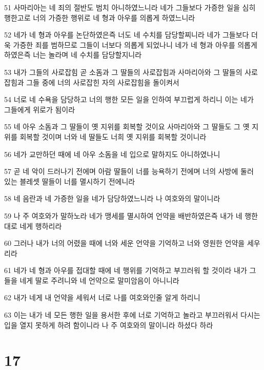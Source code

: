 \par 51 사마리아는 네 죄의 절반도 범치 아니하였느니라 네가 그들보다 가증한 일을 심히 행한고로 너의 가증한 행위로 네 형과 아우를 의롭게 하였느니라
\par 52 네가 네 형과 아우를 논단하였은즉 너도 네 수치를 담당할찌니라 네가 그들보다 더욱 가증한 죄를 범하므로 그들이 너보다 의롭게 되었나니 네가 네 형과 아우를 의롭게 하였은즉 너는 놀라며 네 수치를 담당할지니라
\par 53 내가 그들의 사로잡힘 곧 소돔과 그 딸들의 사로잡힘과 사마리아와 그 딸들의 사로잡힘과 그들 중에 너의 사로잡힌 자의 사로잡힘을 돌이켜서
\par 54 너로 네 수욕을 담당하고 너의 행한 모든 일을 인하여 부끄럽게 하리니 이는 네가 그들에게 위로가 됨이라
\par 55 네 아우 소돔과 그 딸들이 옛 지위를 회복할 것이요 사마리아와 그 딸들도 그 옛 지위를 회복할 것이며 너와 네 딸들도 너희 옛 지위를 회복할 것이니라
\par 56 네가 교만하던 때에 네 아우 소돔을 네 입으로 말하지도 아니하였나니
\par 57 곧 네 악이 드러나기 전에며 아람 딸들이 너를 능욕하기 전에며 너의 사방에 둘러 있는 블레셋 딸들이 너를 멸시하기 전에니라
\par 58 네 음란과 네 가증한 일을 네가 담당하였느니라 나 여호와의 말이니라
\par 59 나 주 여호와가 말하노라 네가 맹세를 멸시하여 언약을 배반하였은즉 내가 네 행한대로 네게 행하리라
\par 60 그러나 내가 너의 어렸을 때에 너와 세운 언약을 기억하고 너와 영원한 언약을 세우리라
\par 61 네가 네 형과 아우를 접대할 때에 네 행위를 기억하고 부끄러워 할 것이라 내가 그들을 네게 딸로 주려니와 네 언약으로 말미암음이 아니니라
\par 62 내가 네게 내 언약을 세워서 너로 나를 여호와인줄 알게 하리니
\par 63 이는 내가 네 모든 행한 일을 용서한 후에 너로 기억하고 놀라고 부끄러워서 다시는 입을 열지 못하게 하려 함이니라 나 주 여호와의 말이니라 하셨다 하라

\chapter{17}

